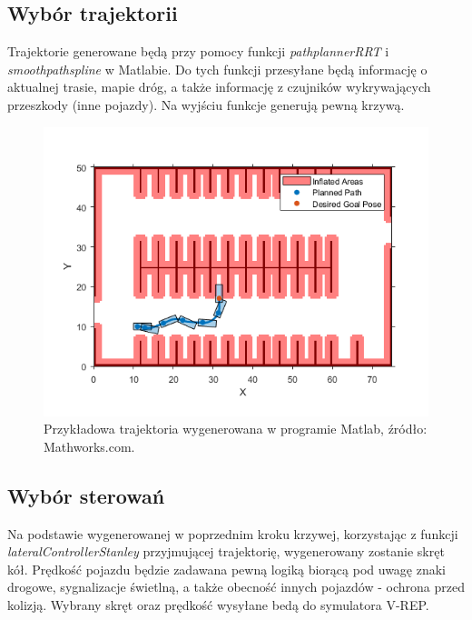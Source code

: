 \subsection{Wybór trajektorii}

Trajektorie generowane będą przy pomocy funkcji \textit{pathplannerRRT} i \textit{smoothpathspline} w Matlabie. Do tych funkcji przesyłane będą informację o aktualnej trasie, mapie dróg, a także informację z czujników wykrywających przeszkody (inne pojazdy). Na wyjściu funkcje generują pewną krzywą.

\begin{figure}[!h]
	\centering
	\includegraphics[width=.8\linewidth]{trajektoria.png}
	\caption{Przykładowa trajektoria wygenerowana w programie Matlab, źródło: Mathworks.com.}
	\label{fig:trajektoria}
\end{figure}

\subsection{Wybór sterowań}

Na podstawie wygenerowanej w poprzednim kroku krzywej, korzystając z funkcji \textit{lateralControllerStanley} przyjmującej trajektorię, wygenerowany zostanie skręt kół. Prędkość pojazdu będzie zadawana pewną logiką biorącą pod uwagę znaki drogowe, sygnalizacje świetlną, a także obecność innych pojazdów - ochrona przed kolizją. Wybrany skręt oraz prędkość wysyłane bedą do symulatora V-REP.
 
